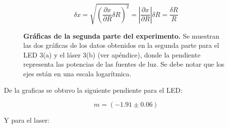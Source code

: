 \documentclass[DIV=calc, paper=a4, fontsize=11pt]{scrartcl}
\begin{document}
\begin{equation*}
    \delta x = \sqrt{\left( \frac{\partial x}{\partial R} \delta R \right)^2} = \left|\frac{\partial x}{\partial R}\right| \delta R = \frac{\delta R}{R}
\end{equation*}
\begin{figure}[H]
 \centering
    \caption{\textbf{Gráficas de la segunda parte del experimento.} Se muestran las dos gráficas de los datos obtenidos en la segunda parte para el LED 3(a) y el láser 3(b) (ver apéndice), donde la pendiente representa las potencias de las fuentes de luz. Se debe notar que los ejes están en una escala logarítmica.}
 \label{f:Parte 2}
\end{figure}

De la graficas se obtuvo la siguiente pendiente para el LED:

\begin{equation*}
    m = (-1.91 \pm 0.06)
\end{equation*}

Y para el laser:
\end{document}
